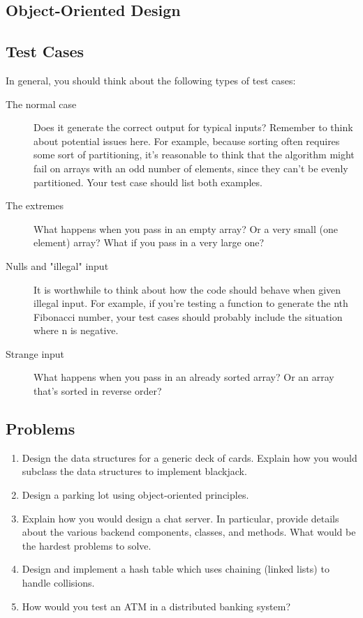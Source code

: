 \documentclass{article}
\begin{document}
	\subsection{Object-Oriented Design}

	\subsection{Test Cases}
		In general, you should think about the following types of test cases:
		\begin{description}
			\item[The normal case] Does it generate the correct output for typical inputs? Remember to think about potential issues here. For example, because sorting often requires some sort of partitioning, it's reasonable to think that the algorithm might fail on arrays with an odd number of elements, since they can't be evenly partitioned. Your test case should list both examples.
			\item[The extremes] What happens when you pass in an empty array? Or a very small (one element) array? What if you pass in a very large one?
			\item[Nulls and "illegal" input] It is worthwhile to think about how the code should behave when given illegal input. For example, if you're testing a function to generate the nth Fibonacci number, your test cases should probably include the situation where n is negative.
			\item[Strange input] What happens when you pass in an already sorted array? Or an array that's sorted in reverse order?
		\end{description}

	\subsection{Problems}
		\begin{enumerate}
			\item Design the data structures for a generic deck of cards. Explain how you would subclass the data structures to implement blackjack.
			\item Design a parking lot using object-oriented principles.
			\item Explain how you would design a chat server. In particular, provide details about the various backend components, classes, and methods. What would be the hardest problems to solve.
			\item Design and implement a hash table which uses chaining (linked lists) to handle collisions.
			\item How would you test an ATM in a distributed banking system?
		\end{enumerate}
\end{document}
